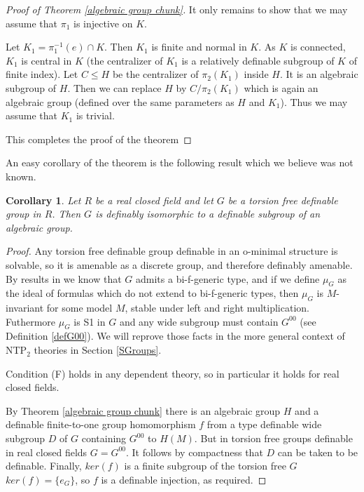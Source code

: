 \documentclass[12pt]{article}
\newtheorem{cor}[thm]{Corollary}
\theoremstyle{definition}
\theoremstyle{mystyle}
\theoremstyle{remark}
\begin{document}
\begin{proof}[Proof of Theorem \ref{algebraic group chunk}]
It only remains to show that we may assume that $\pi_1$ is
injective on $K$.

Let $K_1 = \pi_1^{-1}(e)\cap K$. Then $K_1$ is finite and normal
in $K$. As $K$ is connected, $K_1$ is central in $K$ (the
centralizer of $K_1$ is a relatively definable subgroup of $K$ of
finite index). Let $C\leq H$ be the centralizer of $\pi_2(K_1)$
inside $H$. It is an algebraic subgroup of $H$. Then we can
replace $H$ by $C/\pi_2(K_1)$ which is again an algebraic group
(defined over the same parameters as $H$ and $K_1$). Thus we may
assume that $K_1$ is trivial. %

This completes the proof of the theorem
\end{proof}

An easy corollary of the theorem is the following result which we
believe was not known.

\begin{cor}
Let $R$ be a real closed field and let $G$ be a torsion free
definable group in $R$. Then $G$ is definably isomorphic to a
definable subgroup of an algebraic group.
\end{cor}

\begin{proof}
Any torsion free definable group definable in an o-minimal structure is solvable, so it is amenable as
a discrete group, and therefore definably amenable. By results in
\cite{CS} we know that $G$ admits a bi-f-generic type, and if we
define $\mu_G$ as the ideal of formulas which do not extend to
bi-f-generic types, then $\mu_G$ is $M$-invariant for some model
$M$, stable under left and right multiplication. Futhermore
$\mu_G$ is S1 in $G$ and any wide subgroup must contain $G^{00}$
(see Definition \ref{defG00}). We will reprove those facts in the
more general context of NTP$_2$ theories in Section \ref{SGroups}.

Condition (F) holds in any dependent theory, so in particular it
holds for real closed fields.

By Theorem \ref{algebraic group chunk} there is an algebraic group
$H$ and a definable finite-to-one group homomorphism $f$ from a
type definable wide subgroup $D$ of $G$ containing $G^{00}$ to
$H(M)$. But in torsion free groups definable in real closed fields
$G=G^{00}$. It follows by compactness that $D$ can be taken to be
definable. Finally, $ker(f)$ is a finite subgroup of the torsion
free $G$ $ker(f)=\{e_G\}$, so $f$ is a definable injection, as
required.
\end{proof}
\end{document}
